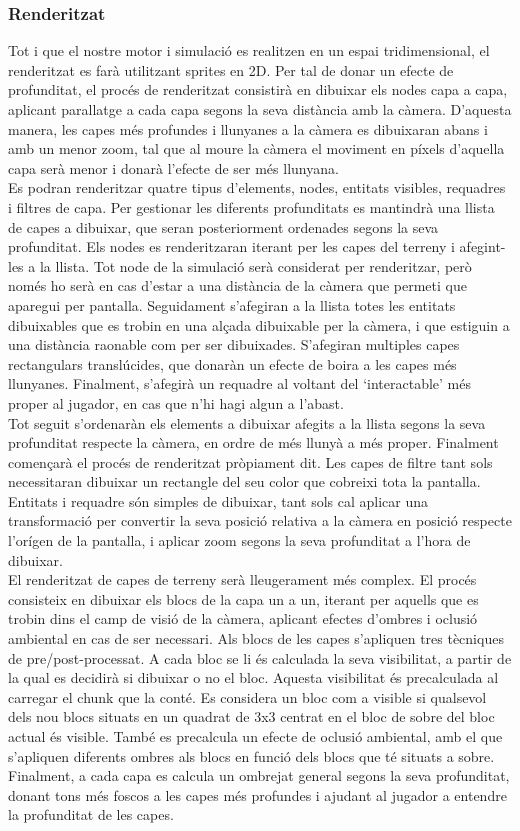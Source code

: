 \subsubsection{Renderitzat}
Tot i que el nostre motor i simulació es realitzen en un espai tridimensional, el renderitzat es farà utilitzant sprites en 2D. 
Per tal de donar un efecte de profunditat, el procés de renderitzat consistirà en dibuixar els nodes capa a capa, aplicant parallatge a cada capa segons la seva distància amb la càmera. 
D'aquesta manera, les capes més profundes i llunyanes a la càmera es dibuixaran abans i amb un menor zoom, tal que al moure la càmera el moviment en píxels d'aquella capa serà menor i donarà l'efecte de ser més llunyana.
\\
Es podran renderitzar quatre tipus d'elements, nodes, entitats visibles, requadres i filtres de capa. Per gestionar les diferents profunditats es mantindrà una llista de capes a dibuixar, que seran posteriorment ordenades segons la seva profunditat. 
Els nodes es renderitzaran iterant per les capes del terreny i afegint-les a la llista. Tot node de la simulació serà considerat per renderitzar, però només ho serà en cas d'estar a una distància de la càmera que permeti que aparegui per pantalla. 
Seguidament s'afegiran a la llista totes les entitats dibuixables que es trobin en una alçada dibuixable per la càmera, i que estiguin a una distància raonable com per ser dibuixades.
S'afegiran multiples capes rectangulars translúcides, que donaràn un efecte de boira a les capes més llunyanes.
Finalment, s'afegirà un requadre al voltant del `interactable' més proper al jugador, en cas que n'hi hagi algun a l'abast.
\\
Tot seguit s'ordenaràn els elements a dibuixar afegits a la llista segons la seva profunditat respecte la càmera, en ordre de més llunyà a més proper.
Finalment començarà el procés de renderitzat pròpiament dit. Les capes de filtre tant sols necessitaran dibuixar un rectangle del seu color que cobreixi tota la pantalla. Entitats i requadre són simples de dibuixar, tant sols cal aplicar una transformació per convertir la seva posició relativa a la càmera en posició respecte l'orígen de la pantalla, i aplicar zoom segons la seva profunditat a l'hora de dibuixar.
\\
El renderitzat de capes de terreny serà lleugerament més complex. El procés consisteix en dibuixar els blocs de la capa un a un, iterant per aquells que es trobin dins el camp de visió de la càmera, aplicant efectes d'ombres i oclusió ambiental en cas de ser necessari.
Als blocs de les capes s'apliquen tres tècniques de pre/post-processat.
A cada bloc se li és calculada la seva visibilitat, a partir de la qual es decidirà si dibuixar o no el bloc. Aquesta visibilitat és precalculada al carregar el chunk que la conté. Es considera un bloc com a visible si qualsevol dels nou blocs situats en un quadrat de 3x3 centrat en el bloc de sobre del bloc actual és visible.
També es precalcula un efecte de oclusió ambiental, amb el que s'apliquen diferents ombres als blocs en funció dels blocs que té situats a sobre.
Finalment, a cada capa es calcula un ombrejat general segons la seva profunditat, donant tons més foscos a les capes més profundes i ajudant al jugador a entendre la profunditat de les capes.

